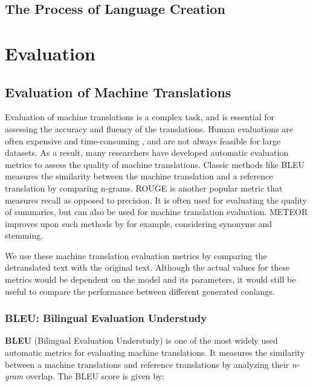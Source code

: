 \subsection{The Process of Language Creation}

\section{Evaluation}
\subsection{Evaluation of Machine Translations}
Evaluation of machine translations is a complex task, and is essential for assessing the accuracy and fluency of the translations. Human evaluations
are often expensive and time-consuming \cite{papineniBLEUMethodAutomatic2002}, and are not always feasible for large datasets. As a result, many researchers 
have developed automatic evaluation metrics to assess the quality of machine translations. Classic methods like BLEU \cite{papineniBLEUMethodAutomatic2002} measures
the similarity between the machine translation and a reference translation by comparing n-grams. ROUGE \cite{linROUGEPackageAutomatic2004} is another popular metric that
measures recall as opposed to precision. It is often used for evaluating the quality of summaries, but can also be used for machine translation evaluation. METEOR \cite{banerjeeMETEORAutomaticMetric2005} 
improves upon such methods by for example, considering synonyms and stemming. 

We use these machine translation evaluation metrics by comparing the detranslated text with the original text. Although the actual values for these metrics would be
dependent on the model and its parameters, it would still be useful to compare the performance between different generated conlangs. 

\subsubsection{BLEU: Bilingual Evaluation Understudy} 
\textbf{BLEU} (Bilingual Evaluation Understudy) \cite{papineniBLEUMethodAutomatic2002} is one of the most widely used automatic metrics for 
evaluating machine translations. It measures the similarity between a machine translations and reference translations by analyzing their \textit{n-gram} overlap. The BLEU score is given by:

